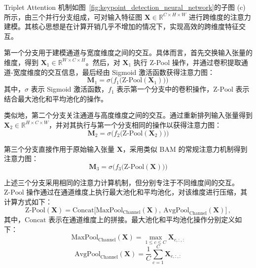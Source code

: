 Triplet Attention 机制如图~\ref{fig:keypoint_detection_neural_network}的子图 (c) 所示，由三个并行分支组成，可对输入特征图 $\mathbf{X} \in \mathbb{R}^{C \times H \times W}$ 进行跨维度的注意力建模。其核心思想是在计算开销几乎不增加的情况下，实现高效的跨维度特征交互。

第一个分支用于建模通道与宽度维度之间的交互。具体而言，首先交换输入张量的维度，得到 $\mathbf{X}_{1} \in \mathbb{R}^{W \times C \times H}$。然后，对 $\mathbf{X}_{1}$ 执行 Z-Pool 操作，并通过卷积提取通道-宽度维度的交互信息，最后经由 Sigmoid 激活函数获得注意力图：
\begin{equation} 
	\mathbf{M}_{1} = \sigma\!\Big(f_{1}\big(\text{Z-Pool}(\mathbf{X}_{1})\big)\Big)\,
\end{equation}
其中，$\sigma$ 表示 Sigmoid 激活函数，$f_{1}$ 表示第一个分支中的卷积操作，$\text{Z-Pool}$ 表示结合最大池化和平均池化的操作。

类似地，第二个分支关注通道与高度维度之间的交互。通过重新排列输入张量得到 $\mathbf{X}_{2} \in \mathbb{R}^{H \times C \times W}$，并对其执行与第一个分支相同的操作以获得注意力图：
\begin{equation} 
	\mathbf{M}_{2} = \sigma\!\Big(f_{2}\big(\text{Z-Pool}(\mathbf{X}_{2})\big)\Big)
\end{equation}

第三个分支直接作用于原始输入张量 $\mathbf{X}$，采用类似 BAM 的常规注意力机制得到注意力图：
\begin{equation} 
	\mathbf{M}_{3} = \sigma\!\Big(f_{3}\big(\text{Z-Pool}(\mathbf{X})\big)\Big)
\end{equation}

上述三个分支采用相同的注意力计算机制，但分别专注于不同维度间的交互。$\text{Z-Pool}$ 操作通过在通道维度上执行最大池化和平均池化，对该维度进行压缩，其计算方式如下：
\begin{equation} 
	\text{Z-Pool}(\mathbf{X}) = \text{Concat}\Big[\text{MaxPool}_{\text{Channel}}(\mathbf{X}),\ \text{AvgPool}_{\text{Channel}}(\mathbf{X})\Big]\,, 
\end{equation}
其中，$\text{Concat}$ 表示在通道维度上的拼接。最大池化和平均池化操作分别定义如下：
\begin{equation} 
	\text{MaxPool}_{\text{Channel}}(\mathbf{X}) = \max_{1 \le c \le C} \mathbf{X}_{c,:,:}
\end{equation}
\begin{equation} 
	\text{AvgPool}_{\text{Channel}}(\mathbf{X}) = \frac{1}{C} \sum_{c=1}^{C} \mathbf{X}_{c,:,:}
\end{equation}

